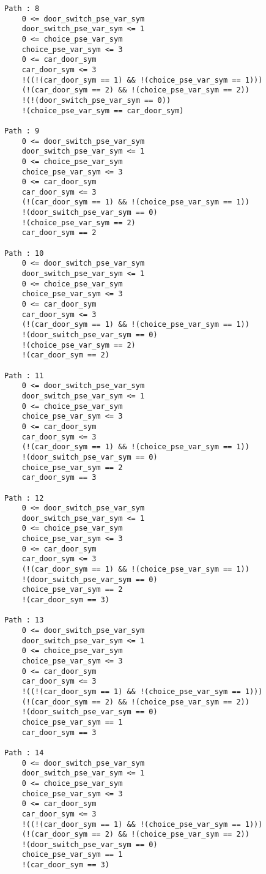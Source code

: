 \documentclass{article}
\begin{document}
\begin{verbatim}
Path : 8
	0 <= door_switch_pse_var_sym
	door_switch_pse_var_sym <= 1
	0 <= choice_pse_var_sym
	choice_pse_var_sym <= 3
	0 <= car_door_sym
	car_door_sym <= 3
	!((!(car_door_sym == 1) && !(choice_pse_var_sym == 1)))
	(!(car_door_sym == 2) && !(choice_pse_var_sym == 2))
	!(!(door_switch_pse_var_sym == 0))
	!(choice_pse_var_sym == car_door_sym)
	
Path : 9
	0 <= door_switch_pse_var_sym
	door_switch_pse_var_sym <= 1
	0 <= choice_pse_var_sym
	choice_pse_var_sym <= 3
	0 <= car_door_sym
	car_door_sym <= 3
	(!(car_door_sym == 1) && !(choice_pse_var_sym == 1))
	!(door_switch_pse_var_sym == 0)
	!(choice_pse_var_sym == 2)
	car_door_sym == 2
	
Path : 10
	0 <= door_switch_pse_var_sym
	door_switch_pse_var_sym <= 1
	0 <= choice_pse_var_sym
	choice_pse_var_sym <= 3
	0 <= car_door_sym
	car_door_sym <= 3
	(!(car_door_sym == 1) && !(choice_pse_var_sym == 1))
	!(door_switch_pse_var_sym == 0)
	!(choice_pse_var_sym == 2)
	!(car_door_sym == 2)
	
Path : 11
	0 <= door_switch_pse_var_sym
	door_switch_pse_var_sym <= 1
	0 <= choice_pse_var_sym
	choice_pse_var_sym <= 3
	0 <= car_door_sym
	car_door_sym <= 3
	(!(car_door_sym == 1) && !(choice_pse_var_sym == 1))
	!(door_switch_pse_var_sym == 0)
	choice_pse_var_sym == 2
	car_door_sym == 3
	
Path : 12
	0 <= door_switch_pse_var_sym
	door_switch_pse_var_sym <= 1
	0 <= choice_pse_var_sym
	choice_pse_var_sym <= 3
	0 <= car_door_sym
	car_door_sym <= 3
	(!(car_door_sym == 1) && !(choice_pse_var_sym == 1))
	!(door_switch_pse_var_sym == 0)
	choice_pse_var_sym == 2
	!(car_door_sym == 3)
	
Path : 13
	0 <= door_switch_pse_var_sym
	door_switch_pse_var_sym <= 1
	0 <= choice_pse_var_sym
	choice_pse_var_sym <= 3
	0 <= car_door_sym
	car_door_sym <= 3
	!((!(car_door_sym == 1) && !(choice_pse_var_sym == 1)))
	(!(car_door_sym == 2) && !(choice_pse_var_sym == 2))
	!(door_switch_pse_var_sym == 0)
	choice_pse_var_sym == 1
	car_door_sym == 3
	
Path : 14
	0 <= door_switch_pse_var_sym
	door_switch_pse_var_sym <= 1
	0 <= choice_pse_var_sym
	choice_pse_var_sym <= 3
	0 <= car_door_sym
	car_door_sym <= 3
	!((!(car_door_sym == 1) && !(choice_pse_var_sym == 1)))
	(!(car_door_sym == 2) && !(choice_pse_var_sym == 2))
	!(door_switch_pse_var_sym == 0)
	choice_pse_var_sym == 1
	!(car_door_sym == 3)
	\end{verbatim}
\end{document}
